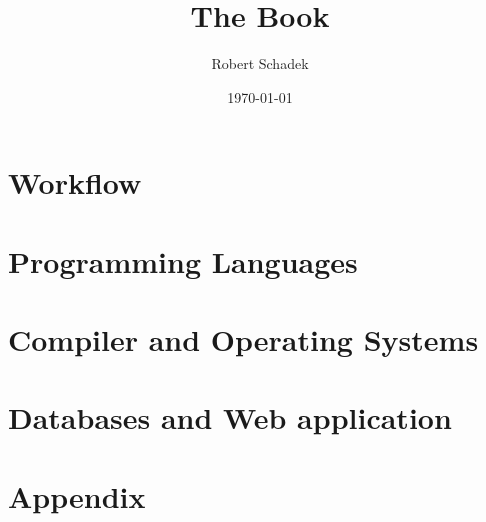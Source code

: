 \documentclass[a4paper,9pt]{book}
\title{The Book}
\author{Robert Schadek}
\date{\today}
\begin{document}
\maketitle
\setcounter{tocdepth}{5}
\setcounter{secnumdepth}{5}

\setlength{\parindent}{0cm}
\setlength{\columnsep}{6mm}
\begin{multicols}{2}
\tableofcontents
\end{multicols}

\twocolumn

\part{Workflow}
\setlength{\columnseprule}{0.1pt}





\part{Programming Languages}







\part{Compiler and Operating Systems}
%

\part{Databases and Web application}


\part{Appendix}
\newpage
{}
{}
\listoffigures

\newpage
{}
{}
\lstlistoflistings
\end{document}
